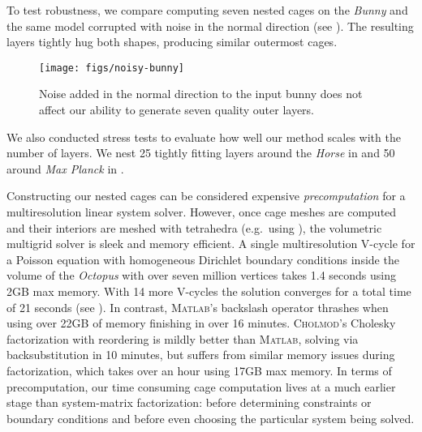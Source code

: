 To test robustness, we compare computing seven nested cages on the \emph{Bunny}
and the same model corrupted with noise in the normal direction (see
). The resulting layers tightly hug both shapes, producing
similar outermost cages.

\begin{figure}
  \texttt{[image: figs/noisy-bunny]}
  \caption{Noise added in the normal direction to the input bunny does not
  affect our ability to generate seven quality outer layers.}
  \label{fig:noisy-bunny}
\end{figure}

We also conducted stress tests to evaluate how well our method scales with the
number of layers. We nest 25 tightly fitting layers around the \emph{Horse} in
 and 50 around \emph{Max Planck} in .

%
Constructing our nested cages can be considered expensive \emph{precomputation}
for a multiresolution linear system solver.
%
However, once cage meshes are computed and their interiors are meshed with
tetrahedra (e.g.\ using \cite{tetgen}),
the volumetric multigrid solver is sleek and memory efficient.
%
A single multiresolution V-cycle for a Poisson equation with homogeneous
Dirichlet boundary conditions inside the volume of the \emph{Octopus} with over
seven million vertices takes 1.4 seconds using 2GB max memory. With 14 more
V-cycles the solution converges for a total time of 21 seconds (see
).
%
In contrast, \textsc{Matlab}'s backslash operator thrashes when using over 22GB
of memory finishing in over 16 minutes.
%
\textsc{Cholmod}'s Cholesky factorization with reordering is mildly better than
\textsc{Matlab}, solving via backsubstitution in 10 minutes, but suffers from
similar memory issues during factorization, which takes over
an hour using 17GB max memory.
%
%
In terms of precomputation, our time consuming cage computation lives at a much
earlier stage than system-matrix factorization: before determining constraints
or boundary conditions and before even choosing the particular system being
solved.
%
%
%
%

